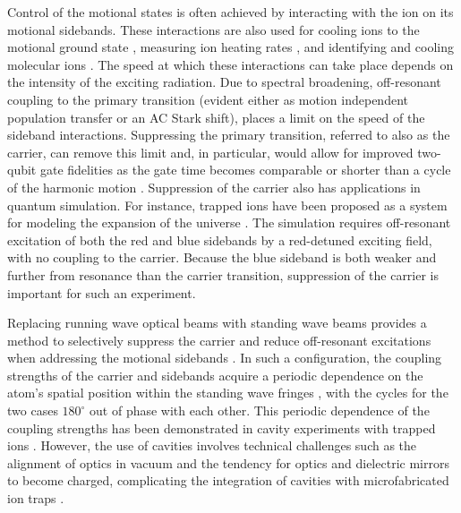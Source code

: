 Control of the motional states is often achieved by interacting with the ion on its motional sidebands. These interactions are also used for cooling ions to the motional ground state \cite{Diedrich89.PRL.62.403}, measuring ion heating rates \cite{Turchette.PRA.61.063418,Shu14.PRA.89.062308}, and identifying and cooling molecular ions \cite{Goeders13.JPhysChemA.117.9725,Rugango15.NJP.17.035009,Wan15.PRA.91.043425}. The speed at which these interactions can take place depends on the intensity of the exciting radiation. Due to spectral broadening, off-resonant coupling to the primary transition (evident either as motion independent population transfer or an AC Stark shift), places a limit on the speed of the sideband interactions. Suppressing the primary transition, referred to also as the carrier, can remove this limit and, in particular, would allow for improved two-qubit gate fidelities as the gate time becomes comparable or shorter than a cycle of the harmonic motion \cite{Sorensen00.PRA.62.022311,Mizrahi14.APB.114.45}. Suppression of the carrier also has applications in quantum simulation.  For instance, trapped ions have been proposed as a system for modeling the expansion of the universe \cite{Menicucci10.NJP.12.095019}. The simulation requires off-resonant excitation of both the red and blue sidebands by a red-detuned exciting field, with no coupling to the carrier. Because the blue sideband is both weaker and further from resonance than the carrier transition, suppression of the carrier is important for such an experiment. 

Replacing running wave optical beams with standing wave beams provides a method to selectively suppress the carrier and reduce off-resonant excitations when addressing the motional sidebands \cite{Cirac92.PRA.46.2668,Zhang12.PRA.85.053420}. In such a configuration, the coupling strengths of the carrier and sidebands acquire a periodic dependence on the atom's spatial position within the standing wave fringes \cite{Cirac92.PRA.46.2668,James98.APB.66.181}, with the cycles for the two cases $180^\circ$ out of phase with each other. This periodic dependence of the coupling strengths has been demonstrated in cavity experiments with trapped ions \cite{Leibrandt09.PRL.103.103001,Guthohrlein01.Nature.414.49,Steiner13.PRL.110.043003,PhysRevLett.89.103001}. However, the use of cavities involves technical challenges such as the alignment of optics in vacuum and the tendency for optics and dielectric mirrors to become charged, complicating the integration of cavities with microfabricated ion traps \cite{Harlander10.NJP.9.093035,Clark14.PRAppl.1.024004}.

